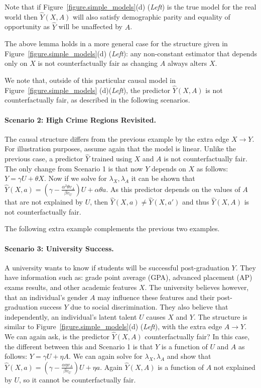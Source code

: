 Note that if Figure~\ref{figure.simple_models}(d) (\emph{Left}) is the
true model for the real world then $\hat Y(X,A)$ will also satisfy
demographic parity and equality of opportunity as $\hat Y$ will be
unaffected by $A$. 

The above lemma holds in a more general case for the structure given
in Figure~\ref{figure.simple_models}(d) (\emph{Left}): any non-constant
estimator that depends only on $X$ is not counterfactually fair as
changing $A$ always alters $X$.

We note that, outside of this
particular causal model in Figure~\ref{figure.simple_models}
(d)(\emph{Left}), the predictor $\hat Y(X,A)$ is not counterfactually
fair, as described in the following scenarios. 

\paragraph{Scenario 2: High Crime Regions Revisited.}

The causal structure differs from the previous example by the extra
edge $X \rightarrow Y$. For illustration purposes, assume again that
the model is linear. Unlike the previous case, a predictor $\hat Y$
trained using $X$ and $A$ is not counterfactually fair. The only
change from Scenario 1 is that now $Y$ depends on $X$ as follows: $Y
\!=\! \gamma U + \theta X$. Now if we solve for $\lambda_X,\lambda_A$
it can be shown that $\hat Y(X,a) \!=\! (\gamma - \frac{\alpha^2
  \theta v_A}{\beta v_U})U + \alpha \theta a$. As this predictor
depends on the values of $A$ that are not explained by $U$, then
$\hat Y(X,a) \!\neq\! \hat Y(X,a')$ and thus $\hat Y(X,A)$ is not
counterfactually fair.

The following extra example complements the previous two examples.

\paragraph{Scenario 3: University Success.}
A university wants to know if students will be successful
post-graduation $Y$. They have information such as: grade point
average (GPA), advanced placement (AP) exams results, and other
academic features $X$. The university believes however, that an
individual's gender $A$ may influence these features and their
post-graduation success $Y$ due to social discrimination. They also
believe that independently, an individual's latent talent $U$ causes
$X$ and $Y$. The structure is similar to
Figure~\ref{figure.simple_models}(d) (\emph{Left}), with the extra
edge $A \rightarrow Y$. We can again ask, is the predictor $\hat
Y(X,A)$ counterfactually fair? In this case, the different between
this and Scenario 1 is that $Y$ is a function of $U$ and $A$ as
follows: $Y \!=\! \gamma U + \eta A$. We can again solve for
$\lambda_X,\lambda_A$ and show that $\hat Y(X,a) \!=\! (\gamma -
\frac{\alpha \eta v_A}{\beta v_U})U + \eta a$. Again $\hat Y(X,A)$ is
a function of $A$ not explained by $U$, so it cannot be counterfactually fair.

